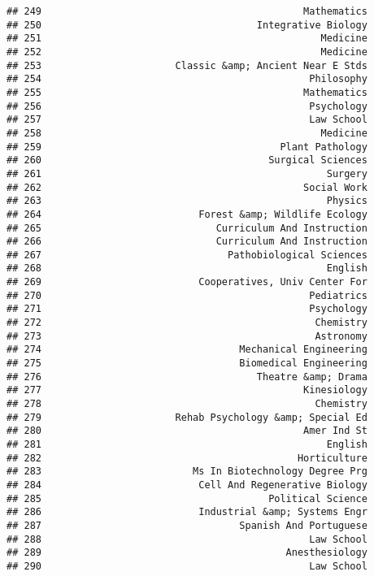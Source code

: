 \documentclass[
]{article}
\begin{document}
\begin{verbatim}
## 249                                             Mathematics
## 250                                     Integrative Biology
## 251                                                Medicine
## 252                                                Medicine
## 253                       Classic &amp; Ancient Near E Stds
## 254                                              Philosophy
## 255                                             Mathematics
## 256                                              Psychology
## 257                                              Law School
## 258                                                Medicine
## 259                                         Plant Pathology
## 260                                       Surgical Sciences
## 261                                                 Surgery
## 262                                             Social Work
## 263                                                 Physics
## 264                           Forest &amp; Wildlife Ecology
## 265                              Curriculum And Instruction
## 266                              Curriculum And Instruction
## 267                                Pathobiological Sciences
## 268                                                 English
## 269                           Cooperatives, Univ Center For
## 270                                              Pediatrics
## 271                                              Psychology
## 272                                               Chemistry
## 273                                               Astronomy
## 274                                  Mechanical Engineering
## 275                                  Biomedical Engineering
## 276                                     Theatre &amp; Drama
## 277                                             Kinesiology
## 278                                               Chemistry
## 279                       Rehab Psychology &amp; Special Ed
## 280                                             Amer Ind St
## 281                                                 English
## 282                                            Horticulture
## 283                          Ms In Biotechnology Degree Prg
## 284                           Cell And Regenerative Biology
## 285                                       Political Science
## 286                           Industrial &amp; Systems Engr
## 287                                  Spanish And Portuguese
## 288                                              Law School
## 289                                          Anesthesiology
## 290                                              Law School

\end{verbatim}
\end{document}
